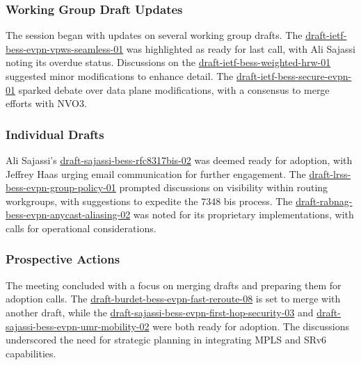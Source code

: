 \documentclass{article}
\begin{document}
\subsubsection{Working Group Draft Updates}
The session began with updates on several working group drafts. The \href{https://datatracker.ietf.org/doc/html/draft-ietf-bess-evpn-vpws-seamless-01}{draft-ietf-bess-evpn-vpws-seamless-01} was highlighted as ready for last call, with Ali Sajassi noting its overdue status. Discussions on the \href{https://datatracker.ietf.org/doc/html/draft-ietf-bess-weighted-hrw-01}{draft-ietf-bess-weighted-hrw-01} suggested minor modifications to enhance detail. The \href{https://datatracker.ietf.org/doc/html/draft-ietf-bess-secure-evpn-01}{draft-ietf-bess-secure-evpn-01} sparked debate over data plane modifications, with a consensus to merge efforts with NVO3.

\subsubsection{Individual Drafts}
Ali Sajassi's \href{https://datatracker.ietf.org/doc/html/draft-sajassi-bess-rfc8317bis-02}{draft-sajassi-bess-rfc8317bis-02} was deemed ready for adoption, with Jeffrey Haas urging email communication for further engagement. The \href{https://datatracker.ietf.org/doc/html/draft-lrss-bess-evpn-group-policy-01}{draft-lrss-bess-evpn-group-policy-01} prompted discussions on visibility within routing workgroups, with suggestions to expedite the 7348 bis process. The \href{https://datatracker.ietf.org/doc/html/draft-rabnag-bess-evpn-anycast-aliasing-02}{draft-rabnag-bess-evpn-anycast-aliasing-02} was noted for its proprietary implementations, with calls for operational considerations.

\subsubsection{Prospective Actions}
The meeting concluded with a focus on merging drafts and preparing them for adoption calls. The \href{https://datatracker.ietf.org/doc/html/draft-burdet-bess-evpn-fast-reroute-08}{draft-burdet-bess-evpn-fast-reroute-08} is set to merge with another draft, while the \href{https://datatracker.ietf.org/doc/html/draft-sajassi-bess-evpn-first-hop-security-03}{draft-sajassi-bess-evpn-first-hop-security-03} and \href{https://datatracker.ietf.org/doc/html/draft-sajassi-bess-evpn-umr-mobility-02}{draft-sajassi-bess-evpn-umr-mobility-02} were both ready for adoption. The discussions underscored the need for strategic planning in integrating MPLS and SRv6 capabilities.
\end{document}
